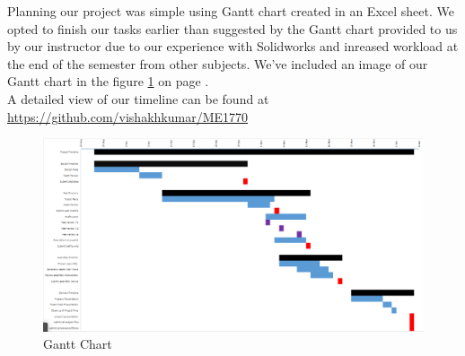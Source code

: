Planning our project was simple using Gantt chart created in an Excel sheet. We opted to finish our tasks earlier than suggested by the Gantt chart provided to us by our instructor due to our experience with Solidworks and inreased workload at the end of the semester from other subjects. 
We've included an image of our Gantt chart in the figure \ref{fig:GanttChart} on page \pageref{fig:GanttChart}.\\
 A detailed view of our timeline can be found at \url{https://github.com/vishakhkumar/ME1770}

\begin{figure}[!ht]
\centering
\includegraphics[angle=90,height=\textheight]{a-1-1-ProjectIdeation/b-2-ProjectManagement/Timeline.png}
\caption{Gantt Chart}
\label{fig:GanttChart}
\end{figure}
